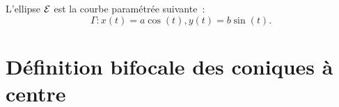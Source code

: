 \begin{prop}
  L'ellipse $\mathcal{E}$ est la courbe paramétrée suivante~:
  \begin{equation}
    \Gamma : x(t)=a\cos(t), y(t)=b\sin(t).
  \end{equation}
\end{prop}


\section{Définition bifocale des coniques à centre}
